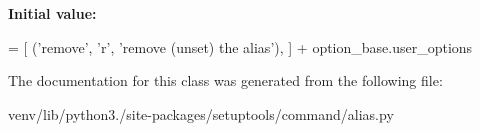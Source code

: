 {\bfseries Initial value\+:}
\begin{DoxyCode}
=  [
        (\textcolor{stringliteral}{'remove'}, \textcolor{stringliteral}{'r', '}remove (unset) the alias'),
    ] + option\_base.user\_options
\end{DoxyCode}


The documentation for this class was generated from the following file\+:\begin{DoxyCompactItemize}
\item 
venv/lib/python3./site-\/packages/setuptools/command/alias.\+py\end{DoxyCompactItemize}
